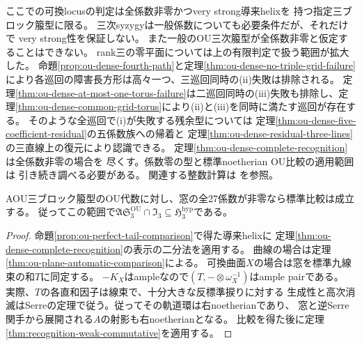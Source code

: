 \begin{remark}
ここでの可換locusの判定は全係数非零かつvery strong導来helixを
持つ指定三ブロック箙型に限る。
三次syzygyは一般係数についても必要条件だが、それだけで
very strong性を保証しない。
また一般のOU三次箙型が全係数非零と仮定することはできない。
rank三の零平面については上の有限判定で扱う範囲が拡大した。
命題\ref{prop:ou-dense-fourth-path}と定理\ref{thm:ou-dense-no-triple-grid-failure}により各巡回の障害長方形は高々一つ、三巡回同時の(ii)失敗は排除される。
定理\ref{thm:ou-dense-at-most-one-torus-failure}は二巡回同時の(iii)失敗も排除し、定理\ref{thm:ou-dense-common-grid-torus}により(ii)と(iii)を同時に満たす巡回が存在する。
そのような全巡回で(i)が失敗する残余型については
定理\ref{thm:ou-dense-five-coefficient-residual}の五係数族への帰着と
定理\ref{thm:ou-dense-residual-three-lines}の三直線上の復元により認識できる。
定理\ref{thm:ou-dense-complete-recognition}は全係数非零の場合を
尽くす。係数零の型と標準noetherian OU比較の適用範囲は
引き続き調べる必要がある。
関連する整数計算は
を参照。
\end{remark}

\begin{corollary}[全係数非零型での比較仮定の除去]
\label{cor:ou-dense-automatic-comparison}
AOU三ブロック箙型のOU代数に対し、窓の全27係数が非零なら標準比較は成立する。
従ってこの範囲で$\mathfrak{AS}^{\mathrm{OU}}_3\cap\mathfrak I_3
\subseteq\mathfrak H^{\mathrm{hyp}}_3$である。
\end{corollary}
\begin{proof}
命題\ref{prop:ou-perfect-tail-comparison}で得た導来helixに
定理\ref{thm:ou-dense-complete-recognition}の表示の二分法を適用する。
曲線の場合は定理\ref{thm:ou-plane-automatic-comparison}による。
可換曲面$X$の場合は窓を標準九線束の和$T$に同定する。
$-K_X$はampleなので$(T,-\otimes\omega_X^{-1})$はample pairである。
実際、$T$の各直和因子は線束で、十分大きな反標準捩りに対する
生成性と高次消滅はSerreの定理で従う。従ってその軌道環は右noetherianであり、
窓と逆Serre関手から展開される$A$の射影も右noetherianとなる。
比較を得た後に定理\ref{thm:recognition-weak-commutative}を適用する。
\end{proof}
